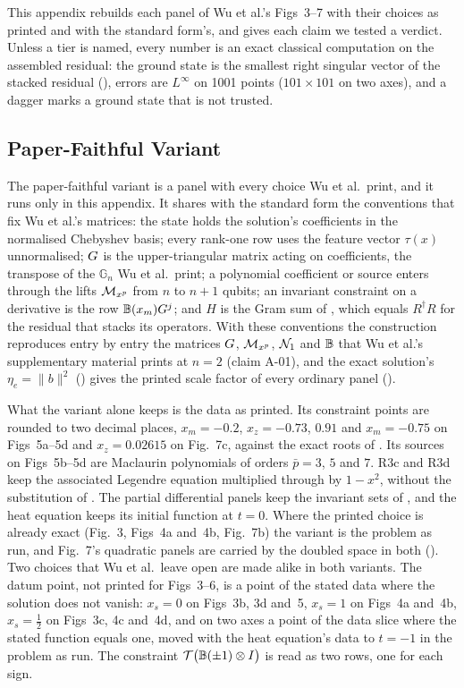 This appendix rebuilds each panel of Wu et al.'s Figs~3--7 \cite{wu2025pihm} with their choices as printed and with the standard form's, and gives each claim we tested a verdict. Unless a tier is named, every number is an exact classical computation on the assembled residual: the ground state is the smallest right singular vector of the stacked residual (), errors are $L^\infty$ on 1001 points ($101\times101$ on two axes), and a dagger marks a ground state that is not trusted.

\subsection{Paper-Faithful Variant}
\label{app:faithful-conventions}

The paper-faithful variant is a panel with every choice Wu et al.\ print, and it runs only in this appendix. It shares with the standard form the conventions that fix Wu et al.'s matrices: the state holds the solution's coefficients in the normalised Chebyshev basis; every rank-one row uses the feature vector $\tau(x)$ unnormalised; $G$ is the upper-triangular matrix acting on coefficients, the transpose of the $\mathbb{G}_n$ Wu et al.\ print; a polynomial coefficient or source enters through the lifts $\mathcal{M}_{x^p}$ from $n$ to $n+1$ qubits; an invariant constraint on a derivative is the row $\mathbb{B}(x_m)G^{j}$; and $H$ is the Gram sum of , which equals $R^\dagger R$ for the residual that stacks its operators. With these conventions the construction reproduces entry by entry the matrices $G$, $\mathcal{M}_{x^p}$, $\mathcal{N}_1$ and $\mathbb{B}$ that Wu et al.'s supplementary material prints at $n=2$ (claim A-01), and the exact solution's $\eta_e=\|b\|^2$ () gives the printed scale factor of every ordinary panel ().

What the variant alone keeps is the data as printed. Its constraint points are rounded to two decimal places, $x_m=-0.2$, $x_z=-0.73$, $0.91$ and $x_m=-0.75$ on Figs~5a--5d and $x_z=0.02615$ on Fig.~7c, against the exact roots of . Its sources on Figs~5b--5d are Maclaurin polynomials of orders $\bar p=3$, $5$ and $7$. R3c and R3d keep the associated Legendre equation multiplied through by $1-x^2$, without the substitution of . The partial differential panels keep the invariant sets of , and the heat equation keeps its initial function at $t=0$. Where the printed choice is already exact (Fig.~3, Figs~4a and~4b, Fig.~7b) the variant is the problem as run, and Fig.~7's quadratic panels are carried by the doubled space in both (). Two choices that Wu et al.\ leave open are made alike in both variants. The datum point, not printed for Figs~3--6, is a point of the stated data where the solution does not vanish: $x_s=0$ on Figs~3b, 3d and~5, $x_s=1$ on Figs~4a and~4b, $x_s=\tfrac12$ on Figs~3c, 4c and~4d, and on two axes a point of the data slice where the stated function equals one, moved with the heat equation's data to $t=-1$ in the problem as run. The constraint $\mathcal T\bigl(\mathbb{B}(\pm1)\otimes I\bigr)$ is read as two rows, one for each sign.

